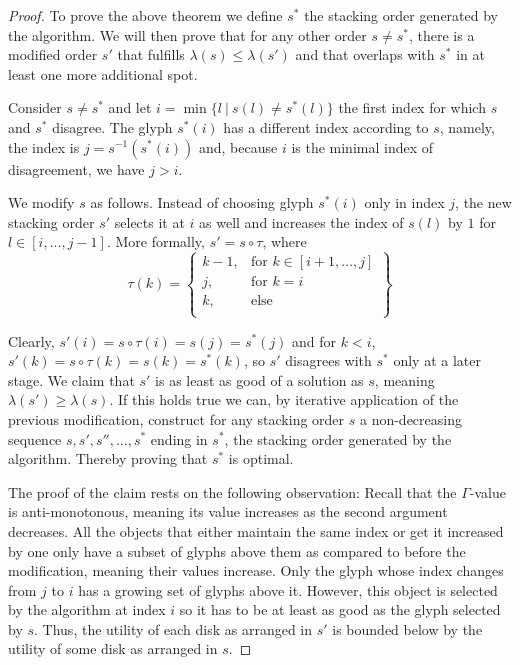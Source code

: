 \documentclass[a4paper,11pt]{article}
\begin{document}
\begin{proof}
To prove the above theorem we define $s^*$ the stacking order generated by the algorithm. We will then prove that for any other order $s\neq s^*$, there is a modified order $s'$ that fulfills $\lambda(s)\leq\lambda(s')$ and that overlaps with $s^*$ in at least one more additional spot.

Consider $s\neq s^*$ and let $i=\min\{l\ |\ s(l)\neq s^*(l)\}$ the first index for which $s$ and $s^*$ disagree. The glyph $s^*(i)$ has a different index according to $s$, namely, the index is $j=s^{-1}(s^*(i))$ and, because $i$ is the minimal index of disagreement, we have $j>i$.

We modify $s$ as follows. Instead of choosing glyph $s^*(i)$ only in index $j$, the new stacking order $s'$ selects it at $i$ as well and increases the index of $s(l)$ by $1$ for $l\in [i,...,j-1]$. More formally, $s'=s\circ \tau$, where
\[
\tau(k) = \left\{\begin{array}{ll}
    k-1, & \text{for } k\in [i+1,\dots,j]\\
    j, & \text{for } k=i\\
    k, & \text{else}\\
    \end{array}\right\}
\]

Clearly, $s'(i) = s\circ\tau(i) = s(j) = s^*(j)$ and for $k<i$, $s'(k) = s\circ\tau(k) = s(k) = s^*(k)$, so $s'$ disagrees with $s^*$ only at a later stage. We claim that $s'$ is as least as good of a solution as $s$, meaning $\lambda(s')\geq\lambda(s)$. If this holds true we can, by iterative application of the previous modification, construct for any stacking order $s$ a non-decreasing sequence $s, s', s'', \dots, s^*$ ending in $s^*$, the stacking order generated by the algorithm. Thereby proving that $s^*$ is optimal.

The proof of the claim rests on the following observation: Recall that the $\Gamma$-value is anti-monotonous, meaning its value increases as the second argument decreases. All the objects that either maintain the same index or get it increased by one only have a subset of glyphs above them as compared to before the modification, meaning their values increase. Only the glyph whose index changes from $j$ to $i$ has a growing set of glyphs above it. However, this object is selected by the algorithm at index $i$ so it has to be at least as good as the glyph selected by $s$. Thus, the utility of each disk as arranged in $s'$ is bounded below by the utility of some disk as arranged in $s$.


\end{proof}
\end{document}
